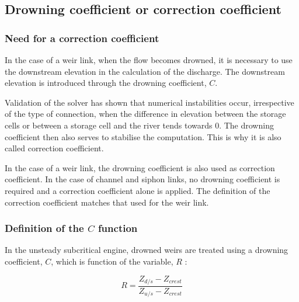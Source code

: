 \subsection{Drowning coefficient or correction coefficient}
\label{CoefAct}

\subsubsection{Need for a correction coefficient}

In the case of a weir link, when the flow becomes drowned, it is necessary to use the downstream elevation in the calculation of the discharge. The downstream elevation is introduced through the drowning coefficient, $C$.

Validation of the solver \cite{RISSOAN02} has shown that numerical instabilities occur, irrespective of the type of connection, when the difference in elevation between the storage cells or between a storage cell and the river tends towards 0. The drowning coefficient then also serves to stabilise the computation. This is why it is also called correction coefficient.

In the case of a weir link, the drowning coefficient is also used as correction coefficient. In the case of channel and siphon links, no drowning coefficient is required and a correction coefficient alone is applied.
The definition of the correction coefficient matches that used for the weir link.

\subsubsection{Definition of the $C$ function}

In the unsteady subcritical engine, drowned weirs are treated using a drowning coefficient, $C$, which is function of the variable, $R$ :

\begin{equation}
  R = \frac{Z_{d/s}-Z_{crest}}{Z_{u/s}-Z_{crest}}
\end{equation}

